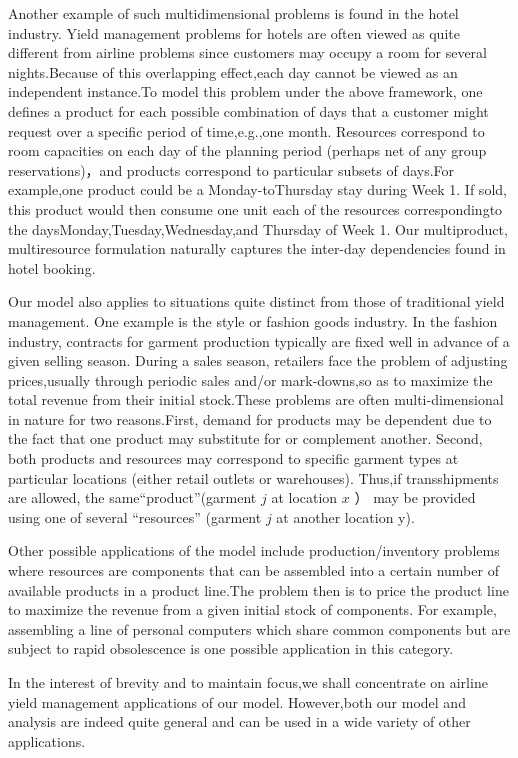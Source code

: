 Another example of such multidimensional problems is found in the hotel
industry. Yield management problems for hotels are often viewed as quite
different from airline problems since customers may occupy a room for
several nights.Because of this overlapping effect,each day cannot be
viewed as an independent instance.To model this problem under the above
framework, one defines a product for each possible combination of days
that a customer might request over a specific period of time,e.g.,one
month. Resources correspond to room capacities on each day of the
planning period (perhaps net of any group reservations)，and products
correspond to particular subsets of days.For example,one product could
be a Monday-toThursday stay during Week 1. If sold, this product would
then consume one unit each of the resources correspondingto the
daysMonday,Tuesday,Wednesday,and Thursday of Week 1. Our multiproduct,
multiresource formulation naturally captures the inter-day dependencies
found in hotel booking.

Our model also applies to situations quite distinct from those of
traditional yield management. One example is the style or fashion goods
industry. In the fashion industry, contracts for garment production
typically are fixed well in advance of a given selling season. During a
sales season, retailers face the problem of adjusting prices,usually
through periodic sales and/or mark-downs,so as to maximize the total
revenue from their initial stock.These problems are often
multi-dimensional in nature for two reasons.First, demand for products
may be dependent due to the fact that one product may substitute for or
complement another. Second, both products and resources may correspond
to specific garment types at particular locations (either retail outlets
or warehouses). Thus,if transshipments are allowed, the
same``product''(garment \(j\) at location \(x\) ） may be provided using
one of several ``resources'' (garment \(j\) at another location y).

Other possible applications of the model include production/inventory
problems where resources are components that can be assembled into a
certain number of available products in a product line.The problem then
is to price the product line to maximize the revenue from a given
initial stock of components. For example, assembling a line of personal
computers which share common components but are subject to rapid
obsolescence is one possible application in this category.

In the interest of brevity and to maintain focus,we shall concentrate on
airline yield management applications of our model. However,both our
model and analysis are indeed quite general and can be used in a wide
variety of other applications.

